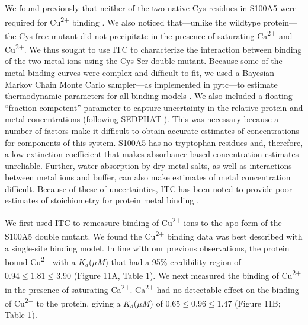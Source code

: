 We found previously that neither of the two native Cys residues in
S100A5 were required for Cu\textsuperscript{2+} binding \cite{wheeler_multiple_2016}.
We also noticed that---unlike the wildtype protein---the Cys-free mutant
did not precipitate in the presence of saturating Ca\textsuperscript{2+} 
and Cu\textsuperscript{2+}. We thus sought to use ITC to characterize
the interaction between binding of the two metal ions using the Cys-Ser
double mutant. Because some of the metal-binding curves were complex
and difficult to fit, we used a Bayesian Markov Chain Monte Carlo
sampler---as implemented in pytc---to estimate thermodynamic parameters
for all binding models \cite{noauthor_pytc:_2017}. We also included
a floating ``fraction competent'' parameter to capture uncertainty
in the relative protein and metal concentrations (following SEDPHAT
\cite{zhao_sedphat_2015}). This was necessary because a number of
factors make it difficult to obtain accurate estimates of concentrations
for components of this system. S100A5 has no tryptophan residues and,
therefore, a low extinction coefficient that makes absorbance-based
concentration estimates unreliable. Further, water absorption by dry
metal salts, as well as interactions between metal ions and buffer,
can also make estimates of metal concentration difficult. Because
of these of uncertainties, ITC has been noted to provide poor estimates
of stoichiometry for protein metal binding \cite{zhang_isothermal_2000}. 

We first used ITC to remeasure binding of Cu\textsuperscript{2+} 
ions to the apo form of the S100A5 double mutant. We found the Cu\textsuperscript{2+} 
binding data was best described with a single-site binding model.
In line with our previous observations, the protein bound Cu\textsuperscript{2+} 
with a $K_{d}$($\mu M$) that had a 95\% credibility region of $0.94\le1.81\le3.90$
(Figure 11A, Table 1). We next measured the binding of Cu\textsuperscript{2+} 
in the presence of saturating Ca\textsuperscript{2+}. Ca\textsuperscript{2+} 
had no detectable effect on the binding of Cu\textsuperscript{2+} 
to the protein, giving a $K_{d}$($\mu M$) of $0.65\le0.96\le1.47$
(Figure 11B; Table 1). 

